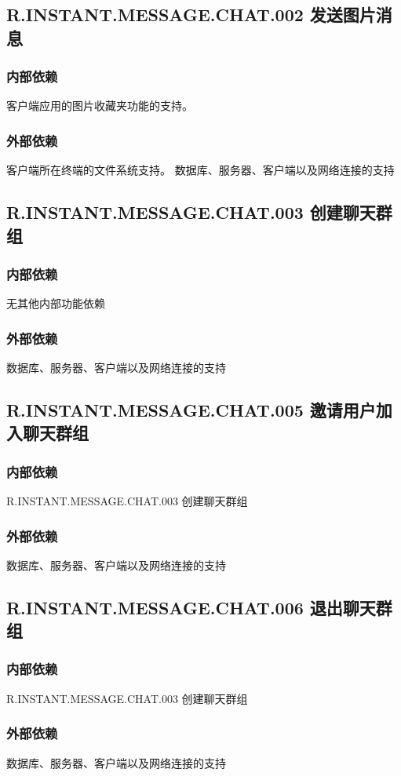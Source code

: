 \subsection{R.INSTANT.MESSAGE.CHAT.002 发送图片消息}
\subsubsection{内部依赖}
    客户端应用的图片收藏夹功能的支持。
\subsubsection{外部依赖}
    客户端所在终端的文件系统支持。
    数据库、服务器、客户端以及网络连接的支持

\subsection{R.INSTANT.MESSAGE.CHAT.003 创建聊天群组}
\subsubsection{内部依赖}
    无其他内部功能依赖
\subsubsection{外部依赖}
    数据库、服务器、客户端以及网络连接的支持

\subsection{R.INSTANT.MESSAGE.CHAT.005 邀请用户加入聊天群组}
\subsubsection{内部依赖}
    R.INSTANT.MESSAGE.CHAT.003 创建聊天群组
\subsubsection{外部依赖}
    数据库、服务器、客户端以及网络连接的支持

\subsection{R.INSTANT.MESSAGE.CHAT.006 退出聊天群组}
\subsubsection{内部依赖}
    R.INSTANT.MESSAGE.CHAT.003 创建聊天群组
\subsubsection{外部依赖}
    数据库、服务器、客户端以及网络连接的支持

